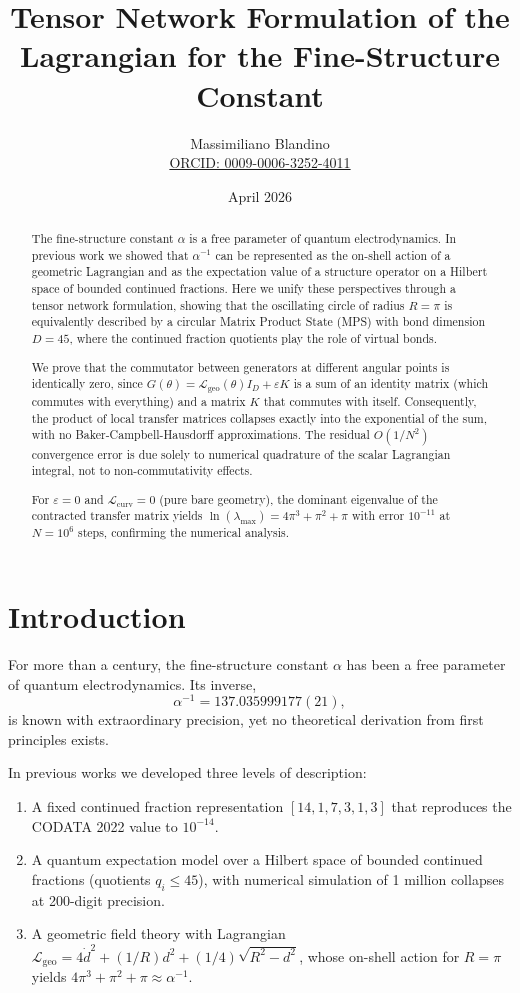 \documentclass[12pt]{article}
\title{Tensor Network Formulation of the Lagrangian for the Fine-Structure Constant}
\author{Massimiliano Blandino \\ 
\href{https://orcid.org/0009-0006-3252-4011}{ORCID: 0009-0006-3252-4011}}
\date{April 2026}
\begin{document}
\maketitle

\begin{abstract}
The fine-structure constant $\alpha$ is a free parameter of quantum electrodynamics.
In previous work we showed that $\alpha^{-1}$ can be represented as the on-shell action
of a geometric Lagrangian and as the expectation value of a structure operator on a
Hilbert space of bounded continued fractions. Here we unify these perspectives
through a tensor network formulation, showing that the oscillating circle of radius
$R = \pi$ is equivalently described by a circular Matrix Product State (MPS) with
bond dimension $D = 45$, where the continued fraction quotients play the role of
virtual bonds.

We prove that the commutator between generators at different angular points is
identically zero, since $G(\theta) = \mathcal{L}_{\text{geo}}(\theta) I_D + \varepsilon K$
is a sum of an identity matrix (which commutes with everything) and a matrix $K$
that commutes with itself. Consequently, the product of local transfer matrices
collapses exactly into the exponential of the sum, with no Baker-Campbell-Hausdorff
approximations. The residual $O(1/N^2)$ convergence error is due solely to numerical
quadrature of the scalar Lagrangian integral, not to non-commutativity effects.

For $\varepsilon = 0$ and $\mathcal{L}_{\text{curv}} = 0$ (pure bare geometry),
the dominant eigenvalue of the contracted transfer matrix yields
$\ln(\lambda_{\text{max}}) = 4\pi^3 + \pi^2 + \pi$ with error $10^{-11}$ at $N = 10^6$
steps, confirming the numerical analysis.
\end{abstract}

\section{Introduction}

For more than a century, the fine-structure constant $\alpha$ has been a free
parameter of quantum electrodynamics. Its inverse,
\[
\alpha^{-1} = 137.035999177(21),
\]
is known with extraordinary precision, yet no theoretical derivation from first
principles exists.

In previous works \cite{blandino2026a,blandino2026b} we developed three levels of
description:
\begin{enumerate}
    \item A fixed continued fraction representation $[14,1,7,3,1,3]$ that reproduces
    the CODATA 2022 value to $10^{-14}$.
    \item A quantum expectation model over a Hilbert space of bounded continued
    fractions (quotients $q_i \le 45$), with numerical simulation of 1 million
    collapses at 200-digit precision.
    \item A geometric field theory with Lagrangian
    $\mathcal{L}_{\text{geo}} = 4\dot{d}^2 + (1/R)d^2 + (1/4)\sqrt{R^2-d^2}$,
    whose on-shell action for $R = \pi$ yields $4\pi^3 + \pi^2 + \pi \approx \alpha^{-1}$.
\end{enumerate}
\end{document}
